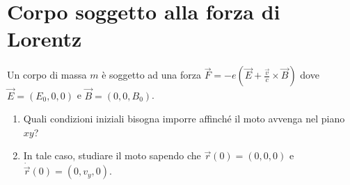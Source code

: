 \section{Corpo soggetto alla forza di Lorentz}
\begin{testo}
	Un corpo di massa $ m $ è soggetto ad una forza $ \vec F = - e (\vec E + \frac{\vec v}{c} \times \vec B) $ dove $ \vec E = (E_0, 0, 0) $ e $ \vec B = (0, 0, B_0) $.
	\begin{enumerate}
		\item Quali condizioni iniziali bisogna imporre affinché il moto avvenga nel piano $ xy $?
		\item In tale caso, studiare il moto sapendo che $ \vec{r}(0) = (0, 0, 0) $ e $ \dot{\vec{r}}(0) = (0, v_y, 0) $.   
	\end{enumerate}
\end{testo}
